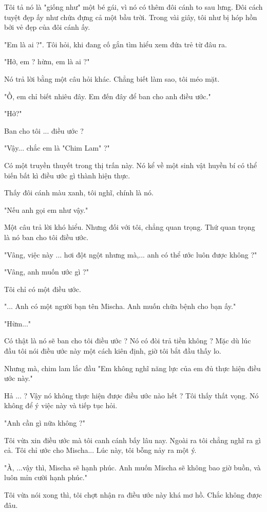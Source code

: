 Tôi tả nó là "giống như" một bé gái, vì nó có thêm đôi cánh to sau lưng. Đôi cách tuyệt đẹp ấy như chứa đựng cả một bầu trời. Trong vài giây, tôi như bị hóp hồn bởi vẻ đẹp của đôi cánh ấy.

"Em là ai ?". Tôi hỏi, khi đang cố gắn tìm hiểu xem đứa trẻ từ đâu ra.

"Hở, em ? hừm, em là ai ?"

Nó trả lời bằng một câu hỏi khác. Chẳng biết làm sao, tôi méo mặt.

"Ồ, em chỉ biết nhiêu đây. Em đến đây để ban cho anh điều ước."

"Hở?"

Ban cho tôi ... điều ước ?

"Vậy... chắc em là "Chim Lam" ?"

Có một truyền thuyết trong thị trấn này. Nó kể về một sinh vật huyền bí có thể biến bất kì điều ước gì thành hiện thực.

Thấy đôi cánh màu xanh, tôi nghĩ, chính là nó.

"Nếu anh gọi em như vậy."

Một câu trả lời khó hiểu. Nhưng đối với tôi, chẳng quan trọng. Thứ quan trọng là nó ban cho tôi điều ước.

"Vâng, việc này ... hơi đột ngột nhưng mà,... anh có thể ước luôn được không ?"

"Vâng, anh muốn ước gì ?"

Tôi chỉ có một điều ước.

"... Anh có một người bạn tên Mischa. Anh muốn chữa bệnh cho bạn ấy."

"Hừm..."

Có thật là nó sẽ ban cho tôi điều ước ? Nó có đòi trả tiền không ? Mặc dù lúc đầu tôi nói điều ước này một cách kiên định, giờ tôi bắt đầu thấy lo.

Nhưng mà, chim lam lắc đầu "Em không nghĩ năng lực của em đủ thực hiện điều ước này."

Hả ... ? Vậy nó không thực hiện được điều ước nào hết ? Tôi thấy thất vọng. Nó không để ý việc này và tiếp tục hỏi.

"Anh cần gì nữa không ?"

Tôi vừa xin điều ước mà tôi canh cánh bấy lâu nay. Ngoài ra tôi chẳng nghĩ ra gì cả. Tôi chỉ ước cho Mischa... Lúc này, tôi bỗng nảy ra một ý.

"À, ...vậy thì, Mischa sẽ hạnh phúc. Anh muốn Mischa sẽ không bao giờ buồn, và luôn mỉn cười hạnh phúc."

Tôi vừa nói xong thì, tôi chợt nhận ra điều ước này khá mơ hồ. Chắc không được đâu.

